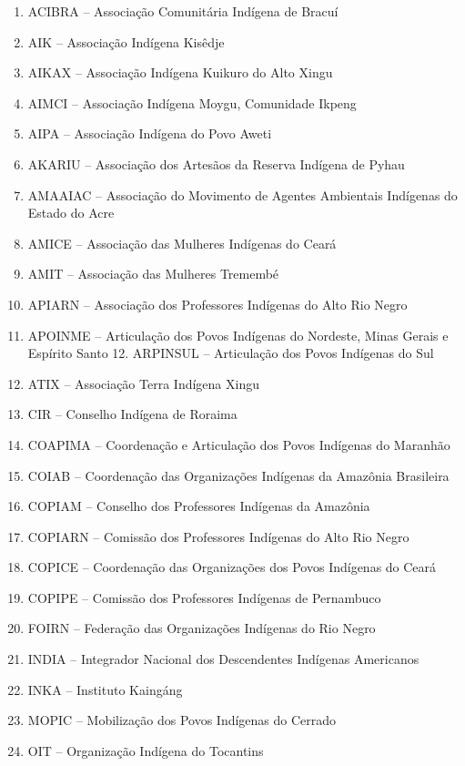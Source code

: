 \documentclass[
]{book}
\begin{document}
\begin{enumerate}
\def\labelenumi{\arabic{enumi}.}
\item
  ACIBRA -- Associação Comunitária Indígena de Bracuí
\item
  AIK -- Associação Indígena Kisêdje
\item
  AIKAX -- Associação Indígena Kuikuro do Alto Xingu
\item
  AIMCI -- Associação Indígena Moygu, Comunidade Ikpeng
\item
  AIPA -- Associação Indígena do Povo Aweti
\item
  AKARIU -- Associação dos Artesãos da Reserva Indígena de Pyhau
\item
  AMAAIAC -- Associação do Movimento de Agentes Ambientais Indígenas do Estado do Acre
\item
  AMICE -- Associação das Mulheres Indígenas do Ceará
\item
  AMIT -- Associação das Mulheres Tremembé
\item
  APIARN -- Associação dos Professores Indígenas do Alto Rio Negro
\item
  APOINME -- Articulação dos Povos Indígenas do Nordeste, Minas Gerais e Espírito Santo 12. ARPINSUL -- Articulação dos Povos Indígenas do Sul
\item
  ATIX -- Associação Terra Indígena Xingu
\item
  CIR -- Conselho Indígena de Roraima
\item
  COAPIMA -- Coordenação e Articulação dos Povos Indígenas do Maranhão
\item
  COIAB -- Coordenação das Organizações Indígenas da Amazônia Brasileira
\item
  COPIAM -- Conselho dos Professores Indígenas da Amazônia
\item
  COPIARN -- Comissão dos Professores Indígenas do Alto Rio Negro
\item
  COPICE -- Coordenação das Organizações dos Povos Indígenas do Ceará
\item
  COPIPE -- Comissão dos Professores Indígenas de Pernambuco
\item
  FOIRN -- Federação das Organizações Indígenas do Rio Negro
\item
  INDIA -- Integrador Nacional dos Descendentes Indígenas Americanos
\item
  INKA -- Instituto Kaingáng
\item
  MOPIC -- Mobilização dos Povos Indígenas do Cerrado
\item
  OIT -- Organização Indígena do Tocantins

\end{enumerate}
\end{document}
